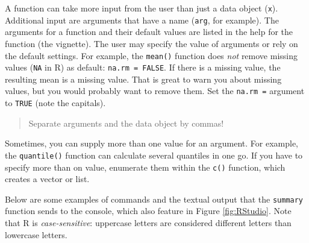 \documentclass[doc,floatsintext]{apa6}
\newenvironment{Shaded}{\begin{snugshade}}{\end{snugshade}}
\newcommand{\KeywordTok}[1]{\textcolor[rgb]{0.13,0.29,0.53}{\textbf{#1}}}
\newcommand{\DataTypeTok}[1]{\textcolor[rgb]{0.13,0.29,0.53}{#1}}
\newcommand{\FloatTok}[1]{\textcolor[rgb]{0.00,0.00,0.81}{#1}}
\newcommand{\StringTok}[1]{\textcolor[rgb]{0.31,0.60,0.02}{#1}}
\newcommand{\CommentTok}[1]{\textcolor[rgb]{0.56,0.35,0.01}{\textit{#1}}}
\newcommand{\OtherTok}[1]{\textcolor[rgb]{0.56,0.35,0.01}{#1}}
\newcommand{\OperatorTok}[1]{\textcolor[rgb]{0.81,0.36,0.00}{\textbf{#1}}}
\newcommand{\NormalTok}[1]{#1}
\begin{document}
A function can take more input from the user than just a data object
(\texttt{x}). Additional input are arguments that have a name
(\texttt{arg}, for example). The arguments for a function and their
default values are listed in the help for the function (the vignette).
The user may specify the value of arguments or rely on the default
settings. For example, the \texttt{mean()} function does \emph{not}
remove missing values (\texttt{NA} in R) as default:
\texttt{na.rm\ =\ FALSE}. If there is a missing value, the resulting
mean is a missing value. That is great to warn you about missing values,
but you would probably want to remove them. Set the \texttt{na.rm\ =}
argument to \texttt{TRUE} (note the capitals).

\begin{quote}
Separate arguments and the data object by commas!
\end{quote}

Sometimes, you can supply more than one value for an argument. For
example, the \texttt{quantile()} function can calculate several
quantiles in one go. If you have to specify more than on value,
enumerate them within the \texttt{c()} function, which creates a vector
or list.

Below are some examples of commands and the textual output that the
\texttt{summary} function sends to the console, which also feature in
Figure \ref{fig:RStudio}. Note that R is \emph{case-sensitive}:
uppercase letters are considered different letters than lowercase
letters.

\begin{Shaded}
\end{Shaded}
\end{document}
